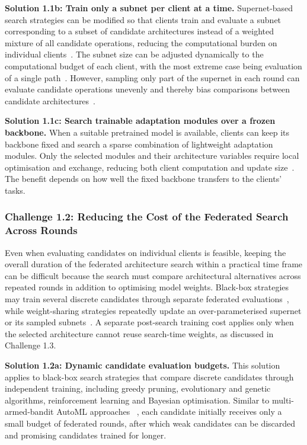 \noindent\textbf{Solution 1.1b: Train only a subnet per client at a time.} Supernet-based search strategies can be modified so that clients train and evaluate a subnet corresponding to a subset of candidate architectures instead of a weighted mixture of all candidate operations, reducing the computational burden on individual clients~\cite{dfnas_2020}. The subnet size can be adjusted dynamically to the computational budget of each client, with the most extreme case being evaluation of a single path~\cite{fedoras_2022,divide-and-conquer_fednas_2023,optimize_fednas_edge_2021,efnas_2024,load_monitoring_fednas_2025}. However, sampling only part of the supernet in each round can evaluate candidate operations unevenly and thereby bias comparisons between candidate architectures~\cite{fedoras_2022,hapfnas_2025}.

\noindent\textbf{Solution 1.1c: Search trainable adaptation modules over a frozen backbone.} When a suitable pretrained model is available, clients can keep its backbone fixed and search a sparse combination of lightweight adaptation modules. Only the selected modules and their architecture variables require local optimisation and exchange, reducing both client computation and update size~\cite{fednaspet_2023}. The benefit depends on how well the fixed backbone transfers to the clients' tasks.

\subsubsection{Challenge 1.2: Reducing the Cost of the Federated Search Across Rounds}

Even when evaluating candidates on individual clients is feasible, keeping the overall duration of the federated architecture search within a practical time frame can be difficult because the search must compare architectural alternatives across repeated rounds in addition to optimising model weights. Black-box strategies may train several discrete candidates through separate federated evaluations~\cite{decnas_2022,rt_fed_evo_nas_2020}, while weight-sharing strategies repeatedly update an over-parameterised supernet or its sampled subnets~\cite{fednas_2021,superfednas_2024}. A separate post-search training cost applies only when the selected architecture cannot reuse search-time weights, as discussed in Challenge 1.3.

\noindent\textbf{Solution 1.2a: Dynamic candidate evaluation budgets.} This solution applies to black-box search strategies that compare discrete candidates through independent training, including greedy pruning, evolutionary and genetic algorithms, reinforcement learning and Bayesian optimisation. Similar to multi-armed-bandit AutoML approaches ~\cite{automl_book_hpo_2019}, each candidate initially receives only a small budget of federated rounds, after which weak candidates can be discarded and promising candidates trained for longer.

